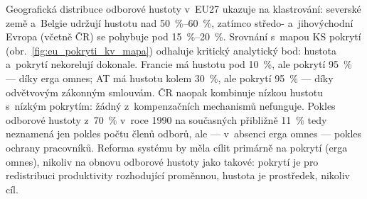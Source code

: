 Geografická distribuce odborové hustoty v~EU27 ukazuje na klastrování: severské země a~Belgie udržují hustotu nad \SIrange{50}{60}{\percent}, zatímco středo- a~jihovýchodní Evropa (včetně ČR) se pohybuje pod \SIrange{15}{20}{\percent}.
Srovnání s~mapou \ac{KS} pokrytí (obr.~\ref{fig:eu_pokryti_kv_mapa}) odhaluje kritický analytický bod: hustota a~pokrytí nekorelují dokonale.
Francie má hustotu pod \SI{10}{\percent}, ale pokrytí \SI{95}{\percent} --- díky erga omnes; AT má hustotu kolem \SI{30}{\percent}, ale pokrytí \SI{95}{\percent} --- díky odvětvovým zákonným smlouvám.
ČR naopak kombinuje nízkou hustotu s~nízkým pokrytím: žádný z~kompenzačních mechanismů nefunguje.
Pokles odborové hustoty z~\SI{70}{\percent} v~roce 1990 na současných přibližně \SI{11}{\percent} tedy neznamená jen pokles počtu členů odborů, ale --- v~absenci erga omnes --- pokles ochrany pracovníků.
Reforma systému by měla cílit primárně na pokrytí (erga omnes), nikoliv na obnovu odborové hustoty jako takové: pokrytí je pro redistribuci produktivity rozhodující proměnnou, hustota je prostředek, nikoliv cíl.


